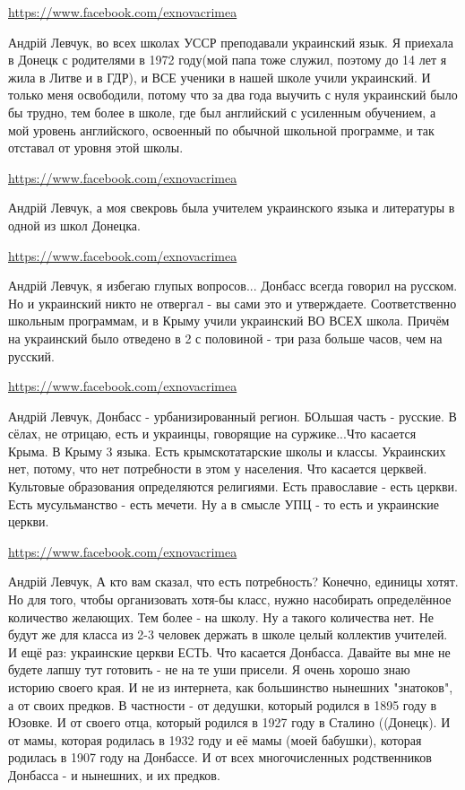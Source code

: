 \documentclass[a4paper,11pt]{extreport}
\begin{document}
\begin{itemize}
\begin{itemize}
\url{https://www.facebook.com/exnovacrimea}

Андрій Левчук, во всех школах УССР преподавали украинский язык. Я приехала в Донецк с родителями в 1972 году(мой папа тоже служил, поэтому до 14 лет я жила в Литве и в ГДР), и ВСЕ ученики в нашей школе учили украинский. И только меня освободили, потому что за два года выучить с нуля украинский было бы трудно, тем более в школе, где был английский с усиленным обучением, а мой уровень английского, освоенный по обычной школьной программе, и так отставал от уровня этой школы.

\url{https://www.facebook.com/exnovacrimea}

Андрій Левчук, а моя свекровь была учителем украинского языка и литературы в одной из школ Донецка.

\url{https://www.facebook.com/exnovacrimea}

Андрій Левчук, я избегаю глупых вопросов... Донбасс всегда говорил на русском. Но и украинский никто не отвергал - вы сами это и утверждаете. Соответственно школьным программам, и в Крыму учили украинский ВО ВСЕХ школа. Причём на украинский было отведено в 2 с половиной - три раза больше часов, чем на русский.

\url{https://www.facebook.com/exnovacrimea}

Андрій Левчук, Донбасс - урбанизированный регион. БОльшая часть - русские. В сёлах, не отрицаю, есть и украинцы, говорящие на суржике...Что касается Крыма. В Крыму 3 языка. Есть крымскотатарские школы и классы. Украинских нет, потому, что нет потребности в этом у населения. Что касается церквей. Культовые образования определяются религиями. Есть православие - есть церкви. Есть мусульманство - есть мечети. Ну а в смысле УПЦ - то есть и украинские церкви.

\url{https://www.facebook.com/exnovacrimea}

Андрій Левчук, А кто вам сказал, что есть потребность? Конечно, единицы хотят. Но для того, чтобы организовать хотя-бы класс, нужно насобирать определённое количество желающих. Тем более - на школу. Ну а такого количества нет. Не будут же для класса из 2-3 человек держать в школе целый коллектив учителей. И ещё раз: украинские церкви ЕСТЬ. Что касается Донбасса. Давайте вы мне не будете лапшу тут готовить - не на те уши присели. Я очень хорошо знаю историю своего края. И не из интернета, как большинство нынешних "знатоков", а от своих предков. В частности - от дедушки, который родился в 1895 году в Юзовке. И от своего отца, который родился в 1927 году в Сталино ((Донецк). И от мамы, которая родилась в 1932 году и её мамы (моей бабушки), которая родилась в 1907 году на Донбассе. И от всех многочисленных родственников Донбасса - и нынешних, и их предков.


\end{itemize}
\end{itemize}
\end{document}
